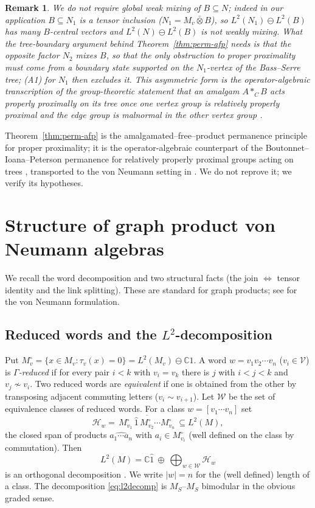 \documentclass[11pt]{article}
\newtheorem{remark}{Remark}
\newcommand{\Gra}{\Gamma}
\newcommand{\VV}{\mathcal V}
\newcommand{\HH}{\mathcal H}
\newcommand{\abs}[1]{\lvert #1\rvert}
\newcommand{\set}[1]{\{#1\}}
\begin{document}
\begin{remark}\label{rem:A2}
We do not require global weak mixing of $B\subseteq N$; indeed in our application $B\subseteq N_1$ is a tensor
inclusion ($N_1=M_v\bar\otimes B$), so $L^2(N_1)\ominus L^2(B)$ has many $B$-central vectors and
$L^2(N)\ominus L^2(B)$ is \emph{not} weakly mixing. What the tree-boundary argument behind
Theorem~\ref{thm:perm-afp} needs is that the \emph{opposite} factor $N_2$ mixes $B$, so that the only obstruction
to proper proximality must come from a boundary state supported on the $N_1$-vertex of the Bass--Serre tree;
(A1) for $N_1$ then excludes it. This asymmetric form is the operator-algebraic transcription of the
group-theoretic statement that an amalgam $A*_C B$ acts properly proximally on its tree once one vertex group is
relatively properly proximal and the edge group is malnormal in the \emph{other} vertex group \cite{BIP}.
\end{remark}

Theorem~\ref{thm:perm-afp} is the amalgamated--free--product permanence principle for proper proximality;
it is the operator-algebraic counterpart of the Boutonnet--Ioana--Peterson permanence for relatively
properly proximal groups acting on trees \cite{BIP}, transported to the von Neumann setting in \cite{DEP}.
We do not reprove it; we verify its hypotheses.

\section{Structure of graph product von Neumann algebras}\label{sec:structure}

We recall the word decomposition and two structural facts (the join $\Leftrightarrow$ tensor identity and
the link splitting). These are standard for graph products; see \cite{CFG} for the von Neumann formulation.

\subsection*{Reduced words and the $L^2$-decomposition}

Put $M_v^\circ=\set{x\in M_v:\tau_v(x)=0}=L^2(M_v)\ominus\mathbb C\hat 1$. A word
$w=v_1v_2\cdots v_n$ ($v_i\in\VV$) is \emph{$\Gra$-reduced} if for every pair $i<k$ with $v_i=v_k$ there is
$j$ with $i<j<k$ and $v_j\not\sim v_i$. Two reduced words are \emph{equivalent} if one is obtained from the
other by transposing adjacent commuting letters ($v_i\sim v_{i+1}$). Let $\mathcal W$ be the set of
equivalence classes of reduced words. For a class $w=[v_1\cdots v_n]$ set
\[
\HH_w=\overline{\,M_{v_1}^\circ\,\hat 1\,M_{v_2}^\circ\cdots M_{v_n}^\circ\,}\subseteq L^2(M),
\]
the closed span of products $\widehat{a_1\cdots a_n}$ with $a_i\in M_{v_i}^\circ$ (well defined on the class
by commutation). Then
\begin{equation}\label{eq:l2decomp}
L^2(M)=\mathbb C\hat 1\ \oplus\ \bigoplus_{w\in\mathcal W}\HH_w
\end{equation}
is an orthogonal decomposition \cite{CFG}. We write $\abs{w}=n$ for the (well defined) length of a class.
The decomposition \eqref{eq:l2decomp} is $M_S$--$M_S$ bimodular in the obvious graded sense.
\end{document}
